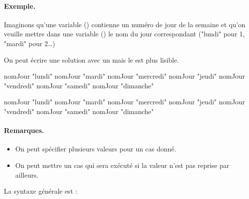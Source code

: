 	\begin{Emphase}
		\paragraph{Exemple.}
		Imaginons qu'une variable () 
		contienne un numéro de jour de la semaine
		et qu'on veuille mettre dans une variable ()
		le nom du jour correspondant 
		("lundi" pour 1, "mardi" pour 2\dots)
		
		On peut écrire une solution avec un 
		mais le  est plus lisible.

		\begin{minipage}{6cm}
			\begin{LDA}
					\Let nomJour \Gets "lundi"
					\Let nomJour \Gets "mardi"
					\Let nomJour \Gets "mercredi"
					\Let nomJour \Gets "jeudi"
					\Let nomJour \Gets "vendredi"
					\Let nomJour \Gets "samedi"
				\Else
					\Let nomJour \Gets "dimanche"
				\EndIf
			\end{LDA}
		\end{minipage}
		\quad
		\begin{minipage}{6cm}
			\begin{LDA}
				\Switch{numéroJour \K{vaut}}
				 nomJour \Gets "lundi"
				 nomJour \Gets "mardi"
				 nomJour \Gets "mercredi"
				 nomJour \Gets "jeudi"
				 nomJour \Gets "vendredi"
				 nomJour \Gets "samedi"
				 nomJour \Gets "dimanche"
				\EndSwitch
			\end{LDA}
		\end{minipage}
		
	\end{Emphase}

	\paragraph{Remarques.}
	\begin{itemize}
	\item
		On peut spécifier plusieurs valeurs pour un cas donné.
	\item
		On peut mettre un cas 
		qui sera exécuté si la valeur n'est pas reprise par ailleurs.
	\end{itemize}
	
	La syntaxe générale est :
	
